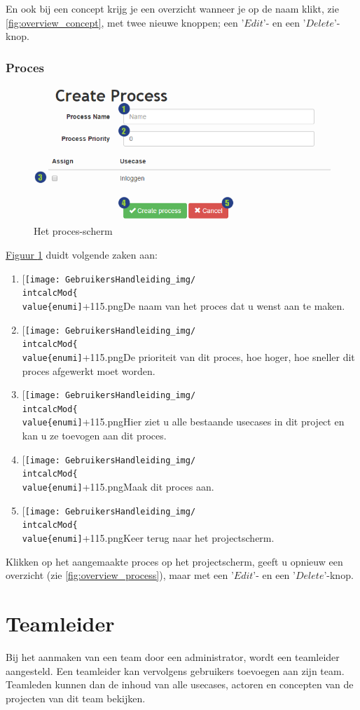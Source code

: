\documentclass[a4paper,11pt]{article}
\newcommand*{\myitem}{
 \item[{\texttt{[image: GebruikersHandleiding\_img/\\intcalcMod\{\\value\{enumi]}+1}{15}.png}}]\stepcounter{enumi}
\begin{document}
En ook bij een concept krijg je een overzicht wanneer je op de naam klikt, zie \autoref{fig:overview_concept}, met twee nieuwe knoppen; een '$Edit$'- en een '$Delete$'-knop.

\subsubsection{Proces}
\label{sec:process}

\begin{figure}[H]
\centering
\includegraphics[scale=0.5]{Gebruikershandleiding_img/process.png}
\caption{Het proces-scherm}
\label{fig:process}
\end{figure}

\hyperref[fig:process]{Figuur \ref{fig:process}} duidt volgende zaken aan:
\begin{enumerate}
\myitem De naam van het proces dat u wenst aan te maken.
\myitem De prioriteit van dit proces, hoe hoger, hoe sneller dit proces afgewerkt moet worden.
\myitem Hier ziet u alle bestaande usecases in dit project en kan u ze toevogen aan dit proces.
\myitem Maak dit proces aan.
\myitem Keer terug naar het projectscherm.
\end{enumerate}

Klikken op het aangemaakte proces op het projectscherm, geeft u opnieuw een overzicht (zie \autoref{fig:overview_process}), maar met een '$Edit$'- en een '$Delete$'-knop.

\section{Teamleider}
\label{sec:teamleider}
Bij het aanmaken van een team door een administrator, wordt een teamleider aangesteld. Een teamleider kan vervolgens gebruikers toevoegen aan zijn team. Teamleden kunnen dan de inhoud van alle usecases, actoren en concepten van de projecten van dit team bekijken.
\end{document}

